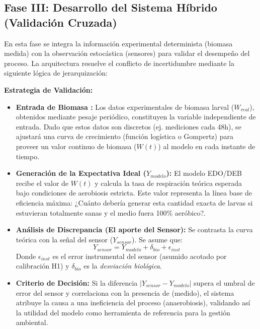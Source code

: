 \subsection{Fase III: Desarrollo del Sistema Híbrido (Validación Cruzada)}

En esta fase se integra la información experimental determinista (biomasa medida) con la observación estocástica (sensores) para validar el desempeño del proceso. La arquitectura resuelve el conflicto de incertidumbre mediante la siguiente lógica de jerarquización:

\textbf{Estrategia de Validación:}

\begin{itemize}\item \textbf{Entrada de Biomasa :} Los datos experimentales de biomasa larval ($W_{real}$), obtenidos mediante pesaje periódico, constituyen la variable independiente de entrada. Dado que estos datos son discretos (ej. mediciones cada 48h), se ajustará una curva de crecimiento (función logística o Gompertz) para proveer un valor continuo de biomasa ($W(t)$) al modelo en cada instante de tiempo.\item \textbf{Generación de la Expectativa Ideal ($Y_{modelo}$):} El modelo EDO/DEB recibe el valor de $W(t)$ y calcula la tasa de respiración teórica esperada bajo condiciones de aerobiosis estricta. Este valor representa la línea base de eficiencia máxima: ¿Cuánto  debería generar esta cantidad exacta de larvas si estuvieran totalmente sanas y el medio fuera 100\% aeróbico?.

\item \textbf{Análisis de Discrepancia (El aporte del Sensor):} Se contrasta la curva teórica con la señal del sensor ($Y_{sensor}$). Se asume que:
\begin{equation}
    Y_{sensor} = Y_{modelo} + \delta_{bio} + \epsilon_{inst}
\end{equation}
Donde $\epsilon_{inst}$ es el error instrumental del sensor (asumido acotado por calibración H1) y $\delta_{bio}$ es la \textit{desviación biológica}.

\item \textbf{Criterio de Decisión:} Si la diferencia $|Y_{sensor} - Y_{modelo}|$ supera el umbral de error del sensor y correlaciona con la presencia de  (medido), el sistema atribuye la causa a una ineficiencia del proceso (anaerobiosis), validando así la utilidad del modelo como herramienta de referencia para la gestión ambiental.
\end{itemize}

